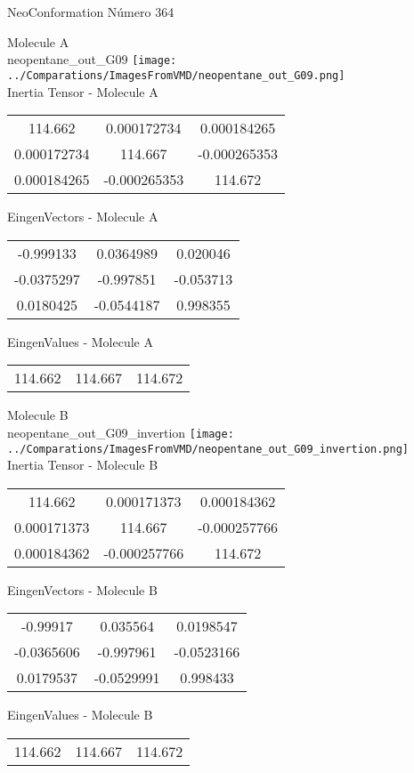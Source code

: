 \vtab[-2cm]
\begin{center}
{\large NeoConformation \tab Número 364}
\end{center}
\begin{multicols}{2}
\begin{center}

Molecule A \\ 
neopentane\_out\_G09
\texttt{[image: ../Comparations/ImagesFromVMD/neopentane\_out\_G09.png]}
\\
Inertia Tensor - Molecule A \\
\vtab

\begin{tabular}{|c c c|}
114.662	 & 	0.000172734	 & 	0.000184265	 \\
0.000172734	 & 	114.667	 & 	-0.000265353	 \\
0.000184265	 & 	-0.000265353	 & 	114.672
\end{tabular}

\vtab
 EingenVectors - Molecule A     \\
\vtab
\begin{tabular}{|c c c|}
-0.999133	 & 	0.0364989	 & 	0.020046	 \\
-0.0375297	 & 	-0.997851	 & 	-0.053713	 \\
0.0180425	 & 	-0.0544187	 & 	0.998355
\end{tabular}

\vtab
 EingenValues - Molecule A     \\
\vtab
\begin{tabular}{|c c c|}
114.662	 & 	114.667	 & 	114.672	 \\
\end{tabular}
\columnbreak

Molecule B \\ 
neopentane\_out\_G09\_invertion
\texttt{[image: ../Comparations/ImagesFromVMD/neopentane\_out\_G09\_invertion.png]}
\\
Inertia Tensor - Molecule B \\
\vtab

\begin{tabular}{|c c c|}
114.662	 & 	0.000171373	 & 	0.000184362	 \\
0.000171373	 & 	114.667	 & 	-0.000257766	 \\
0.000184362	 & 	-0.000257766	 & 	114.672
\end{tabular}

\vtab
 EingenVectors - Molecule B     \\
\vtab
\begin{tabular}{|c c c|}
-0.99917	 & 	0.035564	 & 	0.0198547	 \\
-0.0365606	 & 	-0.997961	 & 	-0.0523166	 \\
0.0179537	 & 	-0.0529991	 & 	0.998433
\end{tabular}

\vtab
 EingenValues - Molecule B     \\
\vtab
\begin{tabular}{|c c c|}
114.662	 & 	114.667	 & 	114.672	 \\
\end{tabular}

\end{center}
\end{multicols}
